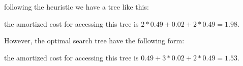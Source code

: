 \documentclass[12pt]{article}
\begin{document}
\begin{enumerate}
following the heuristic we have a tree like this:
the amortized cost for accessing this tree is $2 * 0.49 + 0.02 + 2 * 0.49 = 1.98$.

However, the optimal search tree have the following form:
the amortized cost for accessing this tree is $0.49 + 3 * 0.02 + 2 * 0.49 = 1.53$.


\end{enumerate}
\end{document}
